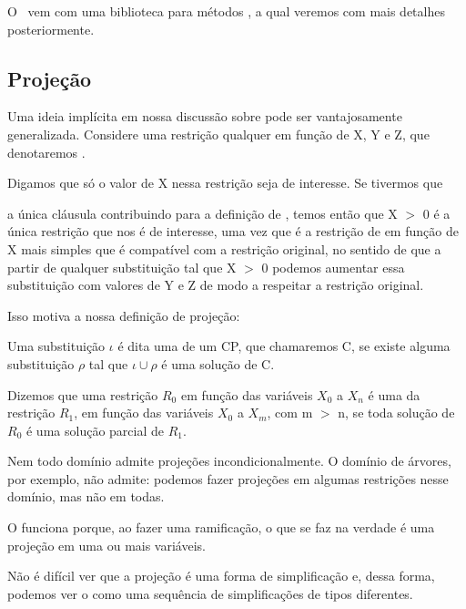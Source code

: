 \documentclass{article}
\begin{document}
O \eclipse\ vem com uma biblioteca para métodos , a qual veremos com mais
detalhes posteriormente.

\subsection{Projeção}

Uma ideia implícita em nossa discussão sobre  pode ser vantajosamente generalizada. Considere uma restrição qualquer em função de X, Y e Z, que denotaremos .

Digamos que só o valor de X nessa restrição seja de interesse. Se tivermos que


 a única cláusula contribuindo para a definição de , temos então que X $>$ 0
é a única restrição que nos é de interesse, uma vez que é a restrição de em função de X mais simples que é compatível com a restrição original, no sentido de que a partir de qualquer substituição tal que X $>$ 0 podemos aumentar essa substituição com valores de Y e Z de modo a respeitar a restrição original.

Isso motiva a nossa definição de projeção:

\begin{definition}
  Uma substituição $\iota$ é dita uma  de um CP, que chamaremos C, se existe alguma substituição $\rho$ tal que $\iota \cup \rho$ é uma solução de C.
\end{definition}

\begin{definition}
  Dizemos que uma restrição $R_0$ em função das variáveis $X_0$ a $X_n$ é uma  da restrição $R_1$, em função das variáveis $X_0$ a $X_m$, com m $>$ n, se toda solução de $R_0$ é uma solução parcial de $R_1$.
\end{definition}

Nem todo domínio admite projeções incondicionalmente. O domínio de árvores, por exemplo, não admite: podemos fazer projeções em algumas restrições nesse domínio, mas não em todas.

O  funciona porque, ao fazer uma ramificação, o que se faz na verdade é uma projeção em uma ou mais variáveis.

Não é difícil ver que a projeção é uma forma de simplificação e, dessa forma, podemos ver o  como uma sequência de simplificações de tipos diferentes.
\end{document}
